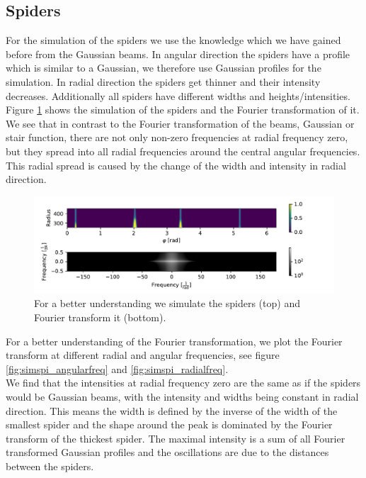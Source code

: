 \subsection{Spiders}
For the simulation of the spiders we use the knowledge which we have gained before from the Gaussian beams. In angular direction the spiders have a profile which is similar to a Gaussian, we therefore use Gaussian profiles for the simulation. In radial direction the spiders get thinner and their intensity decreases. Additionally all spiders have different widths and heights/intensities. Figure \ref{fig:simulated_spyder} shows the simulation of the spiders and the Fourier transformation of it. We see that in contrast to the Fourier transformation of the beams, Gaussian or stair function, there are not only non-zero frequencies at radial frequency zero, but they spread into all radial frequencies around the central angular frequencies. This radial spread is caused by the change of the width and intensity in radial direction.\\
\begin{figure}[H]
	\centering
		\includegraphics[width=1.1\textwidth]{pics/simulated_spyder.pdf}
		\caption{For a better understanding we simulate the spiders (top) and Fourier transform it (bottom).}
		\label{fig:simulated_spyder}
\end{figure}
For a better understanding of the Fourier transformation, we plot the Fourier transform at different radial and angular frequencies, see figure \ref{fig:simspi_angularfreq} and \ref{fig:simspi_radialfreq}.\\
We find that the intensities at radial frequency zero are the same as if the spiders would be Gaussian beams, with the intensity and widths being constant in radial direction. This means the width is defined by the inverse of the width of the smallest spider and the shape around the peak is dominated by the Fourier transform of the thickest spider. The maximal intensity is a sum of all Fourier transformed Gaussian profiles and the oscillations are due to the distances between the spiders. \\
